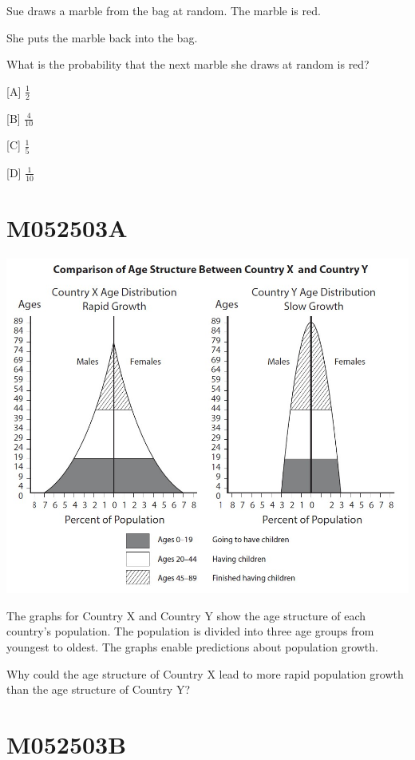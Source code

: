\documentclass[12pt]{article}
\begin{document}
Sue draws a marble from the bag at random. The marble is red.

She puts the marble back into the bag.

What is the probability that the next marble she draws at random is red?

[A] $\frac{1}{2}$

[B] $\frac{4}{10}$

[C] $\frac{1}{5}$

[D] $\frac{1}{10}$

\newpage
\section*{M052503A}

\includegraphics[max width=\textwidth]{2024_02_20_828ebc9d68bcc1fbb223g-87}

The graphs for Country $\mathrm{X}$ and Country $\mathrm{Y}$ show the age structure of each country's population. The population is divided into three age groups from youngest to oldest. The graphs enable predictions about population growth.

Why could the age structure of Country $\mathrm{X}$ lead to more rapid population growth than the age structure of Country Y?

\newpage
\section*{M052503B}
\end{document}
